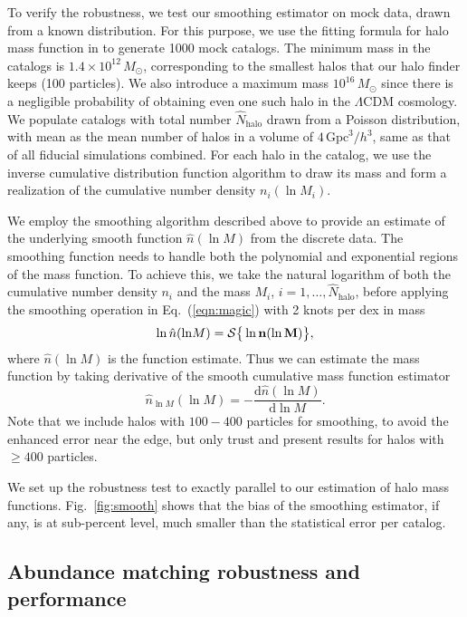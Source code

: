 \documentclass[prd,twocolumn,amsmath,amssymb,floatfix,superscriptaddress]{revtex4-1}
\newcommand{\dr}{\mathrm{d}}
\newcommand{\lnM}{{\ln\!M}}
\begin{document}
To verify the robustness,
we test our smoothing estimator on mock data, drawn from a known distribution.
For this purpose, we use the fitting formula for halo mass function in \cite{TinkerKravEtAl08}
to generate 1000 mock catalogs.
The minimum mass in the catalogs is $1.4\times10^{12}\,M_\odot$, corresponding to the smallest
halos that our halo finder keeps (100 particles).
We also introduce a maximum mass $10^{16}\,M_\odot$ since there is a negligible probability of obtaining even one such halo in the $\Lambda$CDM cosmology.
We populate catalogs with total number $\hat N_\textrm{halo}$ drawn from a Poisson distribution,
with mean as the mean number of halos in a volume of $4\,\textrm{Gpc}^3/h^3$,
same as that of all fiducial simulations combined.  For each halo in the catalog,
we use the inverse cumulative distribution function algorithm to draw
its mass and form a realization of  the cumulative number density $n_i (\ln M_i)$.


We employ the smoothing algorithm described above  to provide an estimate of the
underlying smooth function $\hat n(\ln M)$ from the discrete data.
The smoothing function
needs to handle both the polynomial and exponential regions of 
the mass function. To achieve this, we take the natural logarithm of both the cumulative number density $n_i$
and the mass $M_i$, $i=1,\ldots,\hat N_\textrm{halo}$,
before applying the smoothing operation in Eq.~(\ref{eqn:magic}) with 2 knots per dex in mass
\begin{equation}
    \ln \hat n(\lnM) = \mathcal{S}\big\{\ln {\bf n}(\ln \bf{M})\big\},
\end{equation}
where $\hat n(\lnM)$ is the function estimate.
Thus we can estimate the mass function by taking derivative of the smooth cumulative mass function estimator
\begin{equation}
    \hat n_\lnM(\lnM) = -\frac{\dr\hat n(\lnM)}{\dr\lnM}.
\end{equation}
Note that we include halos with $100-400$ particles for smoothing,
to avoid the enhanced error near the edge, but only trust and present results for halos
with $\geq400$ particles.

We set up the robustness test to
exactly parallel to our estimation of halo mass functions.
Fig.~\ref{fig:smooth} shows that the bias of the smoothing estimator, if any,
is at sub-percent level, much smaller than the statistical error per catalog.




\subsection{Abundance matching robustness and performance}
\label{sub:amrobust}
\end{document}
